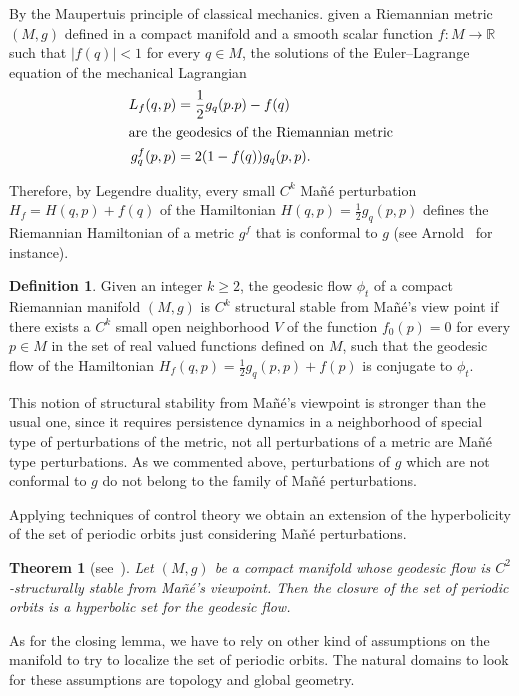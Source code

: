 \documentclass[10pt]{amsart}
\newtheorem{theo}[cdrthm]{Theorem}
\theoremstyle{definition}
\newtheorem{defi}[cdrthm]{Definition}
\newcommand{\bbR}{\mathbb{R}}
\begin{document}
By the Maupertuis principle of classical mechanics. given a Riemannian metric $(M,g)$ defined in a compact manifold and a smooth scalar function $f : M \longrightarrow \bbR$ such that $\mid f(q) \mid <1$ for every $ q \in M$, the solutions of the Euler--Lagrange equation of the mechanical Lagrangian
\begin{align*}
L_{f}(q,p) &= \frac{1}{2}g_{q}(p.p) - f(q)
\\
\intertext{are the geodesics of the Riemannian metric}
g^{f}_{q}(p,p)&= 2(1- f(q))g_{q}(p,p).
\end{align*}

Therefore, by Legendre duality, every small $C^{k}$ Mañé perturbation $H_{f}=H(q,p) + f(q)$ of the Hamiltonian $H(q,p) = \frac{1}{2}g_{q}(p,p)$ defines the Riemannian Hamiltonian of a metric $g^{f}$ that is conformal to $g$ (see Arnold~\cite{kn:Arnold} for instance).

\begin{defi}\label{stability}
Given an integer $k\geq 2$, the geodesic flow $\phi_{t}$ of a compact Riemannian manifold $(M,g)$ is $C^{k}$ structural stable from Mañé's view point if there exists a $C^{k}$ small open neighborhood $V$ of the function $f_{0}(p) = 0$ for every $ p \in M$ in the set of real valued functions defined on $M$, such that the geodesic flow of the Hamiltonian $H_{f}(q,p) = \frac{1}{2}g_{q}(p,p) + f(p)$ is conjugate to $\phi_{t}$.
\end{defi}

This notion of structural stability from Mañé's viewpoint is stronger than the usual one, since it requires persistence dynamics in a neighborhood of special type of perturbations of the metric, not all perturbations of a metric are Mañé type perturbations. As we commented above, perturbations of $g$ which are not conformal to $g$ do not belong to the family of Mañé perturbations.

Applying techniques of control theory we obtain an extension of the hyperbolicity of the set of periodic orbits just considering Mañé perturbations.

\begin{theo}[{see~\cite{kn:ARR}}]\label{persistence}
Let $(M,g)$ be a compact manifold whose geodesic flow is $C^{2}$-structurally stable from Mañé's viewpoint. Then the closure of the set of periodic orbits is a hyperbolic set for the geodesic flow.
\end{theo}

As for the closing lemma, we have to rely on other kind of assumptions on the manifold to try to localize the set of periodic orbits. The natural domains to look for these assumptions are topology and global geometry.
\end{document}
